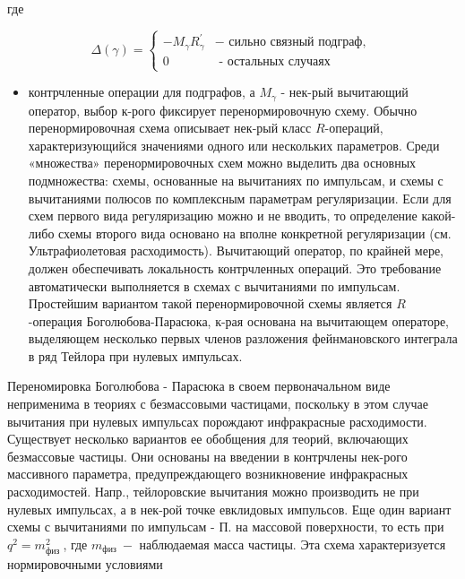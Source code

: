 \documentclass[10pt]{article}
\begin{document}
где



\[

\Delta(\gamma)= \begin{cases}-M_{\gamma} R_{\gamma}^{\prime} & - \text { сильно связный подграф, } \\ 0 & \text { - остальных случаях }\end{cases}

\]



\begin{itemize}

  \item контрчленные операции для подграфов, а $M_{\gamma}$ - нек-рый вычитающий оператор, выбор к-рого фиксирует перенормировочную схему. Обычно перенормировочная схема описывает нек-рый класс $R$-операций, характеризующийся значениями одного или нескольких параметров. Среди «множества» перенормировочных схем можно выделить два основных подмножества: схемы, основанные на вычитаниях по импульсам, и схемы с вычитаниями полюсов по комплексным параметрам регуляризации. Если для схем первого вида регуляризацию можно и не вводить, то определение какой-либо схемы второго вида основано на вполне конкретной регуляризации (см. Ультрафиолетовая расходимость). Вычитающий оператор, по крайней мере, должен обеспечивать локальность контрчленных операций. Это требование автоматически выполняется в схемах с вычитаниями по импульсам. Простейшим вариантом такой перенормировочной схемы является $R$-операция Боголюбова-Парасюка, к-рая основана на вычитающем операторе, выделяющем несколько первых членов разложения фейнмановского интеграла в ряд Тейлора при нулевых импульсах.

\end{itemize}



Переномировка Боголюбова - Парасюка в своем первоначальном виде неприменима в теориях с безмассовыми частицами, поскольку в этом случае вычитания при нулевых импульсах порождают инфракрасные расходимости. Существует несколько вариантов ее обобщения для теорий, включающих безмассовые частицы. Они основаны на введении в контрчлены нек-рого массивного параметра, предупреждающего возникновение инфракрасных расходимостей. Напр., тейлоровские вычитания можно производить не при нулевых импульсах, а в нек-рой точке евклидовых импульсов. Еще один вариант схемы с вычитаниями по импульсам - П. на массовой поверхности, то есть при $q^{2}=m_{\text {физ }}^{2}$, где $m_{\text {физ }}-$ наблюдаемая масса частицы. Эта схема характеризуется нормировочными условиями
\end{document}
